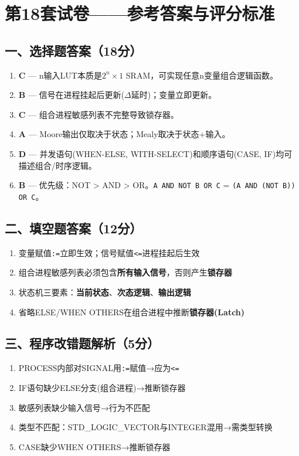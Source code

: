 \chapter{第18套试卷——参考答案与评分标准}

\section{一、选择题答案（18分）}

\begin{enumerate}[label=\arabic*.]
\item \textbf{C} — n输入LUT本质是$2^n\times1$ SRAM，可实现任意n变量组合逻辑函数。
\item \textbf{B} — 信号在进程挂起后更新($\Delta$延时)；变量立即更新。
\item \textbf{C} — 组合进程敏感列表不完整导致锁存器。
\item \textbf{A} — Moore输出仅取决于状态；Mealy取决于状态+输入。
\item \textbf{D} — 并发语句(WHEN-ELSE, WITH-SELECT)和顺序语句(CASE, IF)均可描述组合/时序逻辑。
\item \textbf{B} — 优先级：NOT > AND > OR。\texttt{A AND NOT B OR C} = \texttt{(A AND (NOT B)) OR C}。
\end{enumerate}

\section{二、填空题答案（12分）}

\begin{enumerate}[label=\arabic*.]
\item 变量赋值\texttt{:=}立即生效；信号赋值\texttt{<=}进程挂起后生效
\item 组合进程敏感列表必须包含\textbf{所有输入信号}，否则产生\textbf{锁存器}
\item 状态机三要素：\textbf{当前状态}、\textbf{次态逻辑}、\textbf{输出逻辑}
\item 省略ELSE/WHEN OTHERS在组合进程中推断\textbf{锁存器(Latch)}
\end{enumerate}

\section{三、程序改错题解析（5分）}

\begin{enumerate}[label=错误\arabic*：]
\item PROCESS内部对SIGNAL用\texttt{:=}赋值→应为\texttt{<=}
\item IF语句缺少ELSE分支(组合进程)→推断锁存器
\item 敏感列表缺少输入信号→行为不匹配
\item 类型不匹配：STD\_LOGIC\_VECTOR与INTEGER混用→需类型转换
\item CASE缺少WHEN OTHERS→推断锁存器
\end{enumerate}


